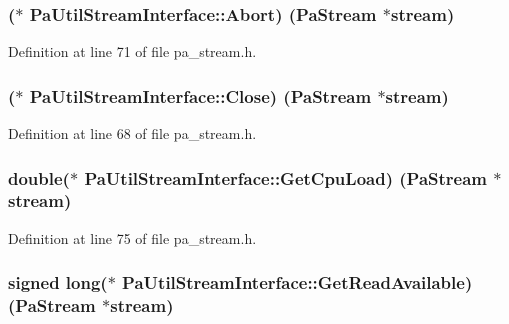 \subsubsection[{\texorpdfstring{Abort}{Abort}}]{($\ast$ Pa\+Util\+Stream\+Interface\+::\+Abort) ({\bf Pa\+Stream} $\ast$stream)}\hypertarget{struct_pa_util_stream_interface_a6025a3448249480366d50eba6870e379}{}\label{struct_pa_util_stream_interface_a6025a3448249480366d50eba6870e379}


Definition at line 71 of file pa\+\_\+stream.\+h.

\subsubsection[{\texorpdfstring{Close}{Close}}]{($\ast$ Pa\+Util\+Stream\+Interface\+::\+Close) ({\bf Pa\+Stream} $\ast$stream)}\hypertarget{struct_pa_util_stream_interface_ad2e59fcef6ea37d6243de9521bebdef1}{}\label{struct_pa_util_stream_interface_ad2e59fcef6ea37d6243de9521bebdef1}


Definition at line 68 of file pa\+\_\+stream.\+h.

\subsubsection[{\texorpdfstring{Get\+Cpu\+Load}{GetCpuLoad}}]{\setlength{\rightskip}{0pt plus 5cm}double($\ast$ Pa\+Util\+Stream\+Interface\+::\+Get\+Cpu\+Load) ({\bf Pa\+Stream} $\ast$stream)}\hypertarget{struct_pa_util_stream_interface_aee1f57e1493d87c6bb2262450ae3f9f6}{}\label{struct_pa_util_stream_interface_aee1f57e1493d87c6bb2262450ae3f9f6}


Definition at line 75 of file pa\+\_\+stream.\+h.

\subsubsection[{\texorpdfstring{Get\+Read\+Available}{GetReadAvailable}}]{\setlength{\rightskip}{0pt plus 5cm}signed long($\ast$ Pa\+Util\+Stream\+Interface\+::\+Get\+Read\+Available) ({\bf Pa\+Stream} $\ast$stream)}\hypertarget{struct_pa_util_stream_interface_aae845782dcdc0466ebef7bd6f213a847}{}\label{struct_pa_util_stream_interface_aae845782dcdc0466ebef7bd6f213a847}


